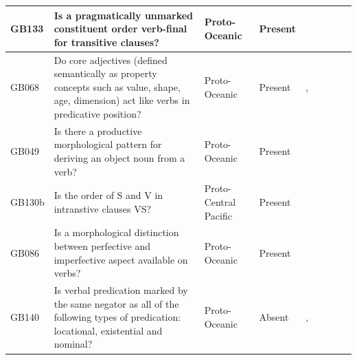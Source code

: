\documentclass[draft,10pt]{article} %
\begin{document}
\begin{landscape}
\begin{longtable}{| p{2cm}| p{3cm}| p{2.5cm}|p{2cm}|p{2cm}|p{2cm}|p{2cm}|p{2cm}|p{2cm}|}
GB133&Is a pragmatically unmarked constituent order verb-final for transitive clauses?&Proto-Oceanic&Present&\citet[118]{pawley1973some}& \cellcolor{hedvig_red!50}{False Negative} & \cellcolor{hedvig_yellow!50}{Half} & \cellcolor{hedvig_yellow!50}{False Negative} & \cellcolor{hedvig_lightgreen!50}{True Positive} \\ \hline
GB068&Do core adjectives (defined semantically as property concepts such as value, shape, age, dimension) act like verbs in predicative position?&Proto-Oceanic&Present&\citet[63, 74]{lynchrosscrowley_proto_grammar_oceanic}, \citet[113]{pawley1973some}& \cellcolor{hedvig_lightgreen!50}{True Positive} & \cellcolor{hedvig_yellow!50}{Half} & \cellcolor{hedvig_yellow!50}{Half} & \cellcolor{hedvig_yellow!50}{Half} \\ \hline
GB049&Is there a productive morphological pattern for deriving an object noun from a verb?&Proto-Oceanic&Present&\citet[70]{lynchrosscrowley_proto_grammar_oceanic}& \cellcolor{hedvig_lightgreen!50}{True Positive} & \cellcolor{hedvig_yellow!50}{Half} & \cellcolor{hedvig_yellow!50}{Half} & \cellcolor{hedvig_yellow!50}{Half} \\ \hline
GB130b&Is the order of S and V in intranstive clauses VS?&Proto-Central Pacific&Present&\citet[122]{kikusawa2002proto}& \cellcolor{hedvig_yellow!50}{Half} & \cellcolor{hedvig_yellow!50}{Half} & \cellcolor{hedvig_yellow!50}{False Negative} & \cellcolor{hedvig_yellow!50}{Half} \\ \hline
GB086&Is a morphological distinction between perfective and imperfective aspect available on verbs?&Proto-Oceanic&Present&\citet[84]{lynchrosscrowley_proto_grammar_oceanic}& \cellcolor{hedvig_red!50}{False Negative} & \cellcolor{hedvig_yellow!50}{Half} & \cellcolor{hedvig_yellow!50}{False Negative} & \cellcolor{hedvig_yellow!50}{Half} \\ \hline
GB140&Is verbal predication marked by the same negator as all of the following types of predication: locational, existential and nominal?&Proto-Oceanic&Absent&\citet[143-6]{pawley1973some}, \citet[88]{lynchrosscrowley_proto_grammar_oceanic}& \cellcolor{hedvig_yellow!50}{Half} & \cellcolor{hedvig_yellow!50}{Half} & \cellcolor{hedvig_red!50}{False Positive} & \cellcolor{hedvig_yellow!50}{Half} \\ \hline



 \end{longtable}
\end{landscape}
\newpage
\end{document}
